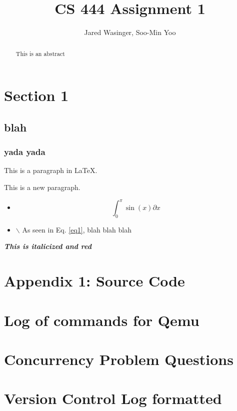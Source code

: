 \documentclass[letterpaper,10pt]{article}
\title{CS 444 Assignment 1}
\author{Jared Wasinger, Soo-Min Yoo}
\begin{document}
\maketitle
\begin{abstract}
	This is an abstract
\end{abstract}
\newpage

\tableofcontents



\section{Section 1}
\subsection{blah}
\subsubsection{yada yada}
This is a paragraph in \LaTeX.

This is a new paragraph.

\begin{itemize}
\item \begin{equation}
    \label{eq1}
    \int_0^\pi \sin(x) \partial x
    \end{equation}
\item $\backslash$ As seen in Eq. \ref{eq1}, blah blah blah
\end{itemize}

\emph{\textbf{\color{red}This is italicized and red}}

\section*{Appendix 1: Source Code}
\section{ Log of commands for Qemu }
\section{Concurrency Problem Questions}
\section{Version Control Log formatted}
\end{document}
